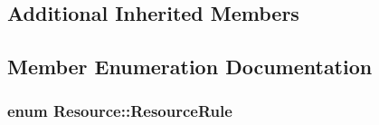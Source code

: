 \subsection*{Additional Inherited Members}


\subsection{Member Enumeration Documentation}
\hypertarget{class_resource_a8e67503c93766e1ecb47c6a9d744f86d}{
\subsubsection[{Resource\-Rule}]{\setlength{\rightskip}{0pt plus 5cm}enum {\bf Resource\-::\-Resource\-Rule}}}\label{class_resource_a8e67503c93766e1ecb47c6a9d744f86d}
